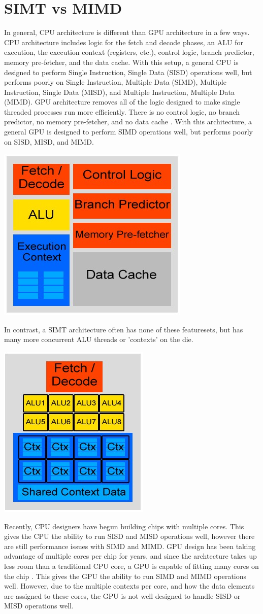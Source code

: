 \documentclass[conference]{IEEEtran}
\begin{document}
\section{SIMT vs MIMD }
\label{simt-description}
In general, CPU architecture is different than GPU architecture in a few ways.  CPU architecture includes logic for the fetch and decode phases, an ALU for execution, the execution context (registers, etc.), control logic, branch predictor, memory pre-fetcher, and the data cache.  With this setup, a general CPU is designed to perform Single Instruction, Single Data (SISD) operations well, but performs poorly on Single Instruction, Multiple Data (SIMD), Multiple Instruction, Single Data (MISD), and Multiple Instruction, Multiple Data (MIMD).  GPU architecture removes all of the logic designed to make single threaded processes run more efficiently.  There is no control logic, no branch predictor, no memory pre-fetcher, and no data cache \cite{SIG09}.  With this architecture, a general GPU is designed to perform SIMD operations well, but performs poorly on SISD, MISD, and MIMD. 

\begin{center}
		\includegraphics[width=.2\textwidth]{CPU-design.jpg} 
\end{center}

In contrast, a SIMT architecture often has none of these featuresets, but has many more concurrent ALU threads or 'contexts' on the die.

\begin{center}
	\includegraphics[width=.2\textwidth]{GPU-Design.jpg}
\end{center}

Recently, CPU designers have begun building chips with multiple cores.  This gives the CPU the ability to run SISD and MISD operations well, however there are still performance issues with SIMD and MIMD.  GPU design has been taking advantage of multiple cores per chip for years, and since the archtecture takes up less room than a traditional CPU core, a GPU is capable of fitting many cores on the chip \cite{Luebke08}.  This gives the GPU the ability to run SIMD and MIMD operations well.  However, due to the multiple contexts per core, and how the data elements are assigned to these cores, the GPU is not well designed to handle SISD or MISD operations well.
\end{document}

